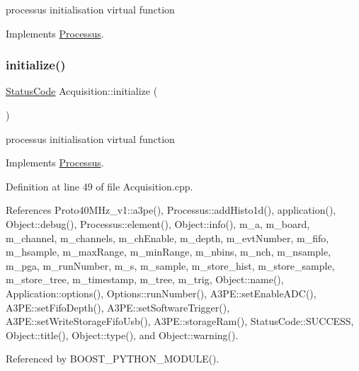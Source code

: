 processus initialisation virtual function 

Implements \hyperlink{classProcessus_aee88ad7b77ae7319cf8b128e9dd2ea11}{Processus}.

\mbox{\label{classAcquisition_acffc6b70b80811657409f92e489584ba}} 
\subsubsection{\texorpdfstring{initialize()}{initialize()}\hspace{0.1cm}{\footnotesize\ttfamily [2/2]}}
{\footnotesize\ttfamily \hyperlink{classStatusCode}{Status\+Code} Acquisition\+::initialize (\begin{DoxyParamCaption}{ }\end{DoxyParamCaption})\hspace{0.3cm}{\ttfamily [virtual]}}

processus initialisation virtual function 

Implements \hyperlink{classProcessus_aee88ad7b77ae7319cf8b128e9dd2ea11}{Processus}.



Definition at line 49 of file Acquisition.\+cpp.



References Proto40\+M\+Hz\+\_\+v1\+::a3pe(), Processus\+::add\+Histo1d(), application(), Object\+::debug(), Processus\+::element(), Object\+::info(), m\+\_\+a, m\+\_\+board, m\+\_\+channel, m\+\_\+channels, m\+\_\+ch\+Enable, m\+\_\+depth, m\+\_\+evt\+Number, m\+\_\+fifo, m\+\_\+hsample, m\+\_\+max\+Range, m\+\_\+min\+Range, m\+\_\+nbins, m\+\_\+nch, m\+\_\+nsample, m\+\_\+pga, m\+\_\+run\+Number, m\+\_\+s, m\+\_\+sample, m\+\_\+store\+\_\+hist, m\+\_\+store\+\_\+sample, m\+\_\+store\+\_\+tree, m\+\_\+timestamp, m\+\_\+tree, m\+\_\+trig, Object\+::name(), Application\+::options(), Options\+::run\+Number(), A3\+P\+E\+::set\+Enable\+A\+D\+C(), A3\+P\+E\+::set\+Fifo\+Depth(), A3\+P\+E\+::set\+Software\+Trigger(), A3\+P\+E\+::set\+Write\+Storage\+Fifo\+Usb(), A3\+P\+E\+::storage\+Ram(), Status\+Code\+::\+S\+U\+C\+C\+E\+SS, Object\+::title(), Object\+::type(), and Object\+::warning().



Referenced by B\+O\+O\+S\+T\+\_\+\+P\+Y\+T\+H\+O\+N\+\_\+\+M\+O\+D\+U\+L\+E().


